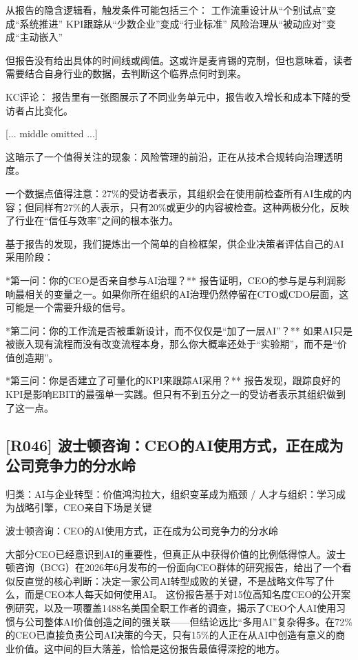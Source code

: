 \documentclass[11pt]{ctexart}
\begin{document}
从报告的隐含逻辑看，触发条件可能包括三个： 工作流重设计从“个别试点”变成“系统推进” KPI跟踪从“少数企业”变成“行业标准” 风险治理从“被动应对”变成“主动嵌入”

但报告没有给出具体的时间线或阈值。这或许是麦肯锡的克制，但也意味着，读者需要结合自身行业的数据，去判断这个临界点何时到来。

KC评论： 报告里有一张图展示了不同业务单元中，报告收入增长和成本下降的受访者占比变化。

[... middle omitted ...]

这暗示了一个值得关注的现象：风险管理的前沿，正在从技术合规转向治理透明度。

一个数据点值得注意：27\%的受访者表示，其组织会在使用前检查所有AI生成的内容；但同样有27\%的人表示，只有20\%或更少的内容被检查。这种两极分化，反映了行业在“信任与效率”之间的根本张力。

基于报告的发现，我们提炼出一个简单的自检框架，供企业决策者评估自己的AI采用阶段：

*第一问：你的CEO是否亲自参与AI治理？** 报告证明，CEO的参与是与利润影响最相关的变量之一。如果你所在组织的AI治理仍然停留在CTO或CDO层面，这可能是一个需要升级的信号。

*第二问：你的工作流是否被重新设计，而不仅仅是“加了一层AI”？** 如果AI只是被嵌入现有流程而没有改变流程本身，那么你大概率还处于“实验期”，而不是“价值创造期”。

*第三问：你是否建立了可量化的KPI来跟踪AI采用？** 报告发现，跟踪良好的KPI是影响EBIT的最强单一实践。但只有不到五分之一的受访者表示其组织做到了这一点。

\subsection{[R046] 波士顿咨询：CEO的AI使用方式，正在成为公司竞争力的分水岭}
{\small\color{refgray}归类：AI与企业转型：价值鸿沟拉大，组织变革成为瓶颈 / 人才与组织：学习成为战略引擎，CEO亲自下场是关键}

波士顿咨询：CEO的AI使用方式，正在成为公司竞争力的分水岭

大部分CEO已经意识到AI的重要性，但真正从中获得价值的比例低得惊人。波士顿咨询（BCG）在2026年6月发布的一份面向CEO群体的研究报告，给出了一个看似反直觉的核心判断：决定一家公司AI转型成败的关键，不是战略文件写了什么，而是CEO本人每天如何使用AI。 这份报告基于对15位高知名度CEO的公开案例研究，以及一项覆盖1488名美国全职工作者的调查，揭示了CEO个人AI使用习惯与公司整体AI价值创造之间的强关联——但结论远比“多用AI”复杂得多。在72\%的CEO已直接负责公司AI决策的今天，只有15\%的人正在从AI中创造有意义的商业价值。这中间的巨大落差，恰恰是这份报告最值得深挖的地方。
\end{document}
